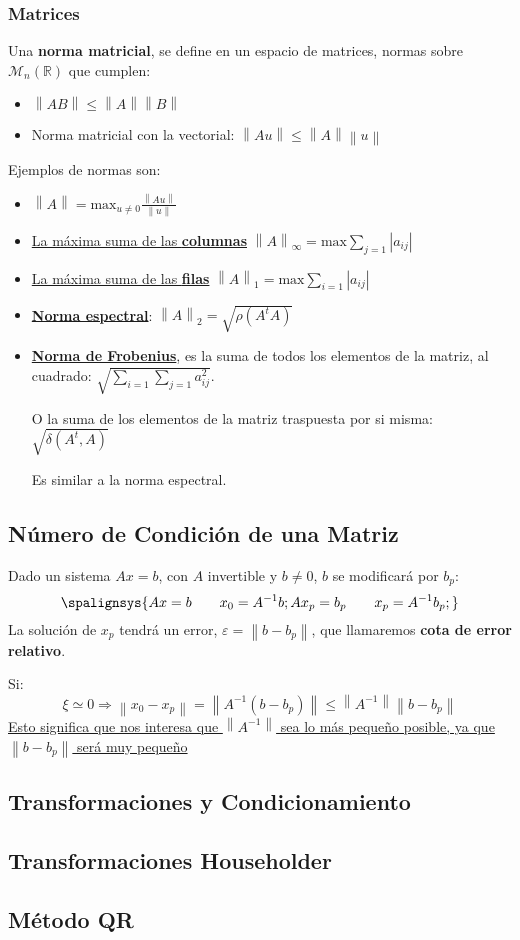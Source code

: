 \subsubsection{Matrices}
Una \textbf{norma matricial}, se define en un espacio de matrices, normas sobre \(\mathcal{M}_n(\mathbb{R})\) que cumplen:
\begin{itemize}
        \item \(\left \| AB \right \| \leq  \left \|  A\right \|\left \|  B\right \|\)
        \item Norma matricial con la vectorial: \(\left \| Au \right \| \leq \left \| A \right \| \left \| u \right \|\)
\end{itemize}
Ejemplos de normas son:
\begin{itemize}
        \item \(\left \| A \right \| = \text{max}_{u \neq 0} \frac{\left \| Au \right \|}{\left \| u \right \|}\)
        \item \underline{La máxima suma de las \textbf{columnas}} \(\left \| A \right \|_\infty = \text{max} \sum_{j=1} \left | a_{ij} \right |\)
        \item \underline{La máxima suma de las \textbf{filas}} \(\left \| A \right \|_1 = \text{max} \sum_{i=1} \left | a_{ij} \right |\)
        \item \textbf{\underline{Norma espectral}}: \(\left \| A \right \|_2 = \sqrt{\rho(A^tA)}\)
        \item \textbf{\underline{Norma de Frobenius}}, es la suma de todos los elementos de la matriz, al cuadrado: \(\sqrt{\sum_{i=1}\sum_{j=1} a_{ij}^2}\).\par O la suma de los elementos de la matriz traspuesta por si misma: \(\sqrt{\delta(A^t,A)}\) \par Es similar a la norma espectral.
\end{itemize}
\subsection{Número de Condición de una Matriz}
Dado un sistema \(Ax=b\), con \(A\) invertible y \(b \neq 0\), \(b\) se modificará por \(b_p\):
\[
        \spalignsys{
                Ax = b \hspace{2em} x_0 = A^{-1}b;
                Ax_p = b_p \hspace{2em} x_p = A^{-1}b_p;
        }
\]
La solución de \(x_p\) tendrá un error, \(\varepsilon = \left \| b - b_p \right \|\), que llamaremos \textbf{cota de error relativo}. \par Si:
\[\xi \simeq 0 \Rightarrow  \left \| x_0 - x_p \right \| = \left \| A^{-1} \left ( b -b_p \right )\right \| \leq \left \| A^{-1} \right \| \left \| b - b_p \right \|\]
\underline{Esto significa que nos interesa que \(\left \| A^{-1} \right \|\) sea lo más pequeño posible, ya que \(\left \| b - b_p \right \|\) será muy pequeño}

\subsection{Transformaciones y Condicionamiento}
\subsection{Transformaciones Householder}
\subsection{Método QR}